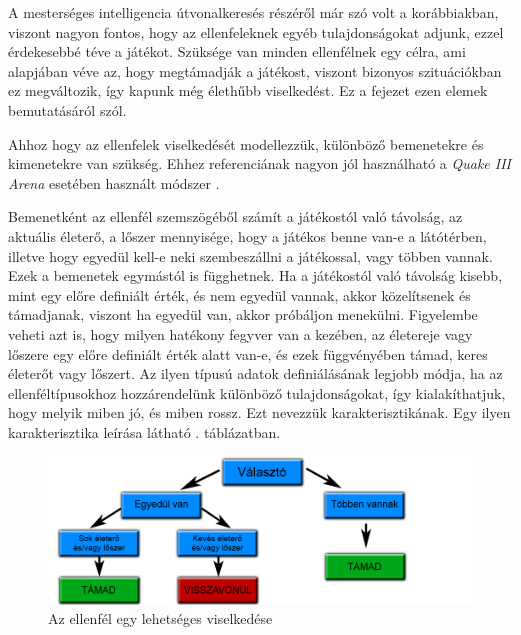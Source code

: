 \label{Chap:viselkedes}

A mesterséges intelligencia útvonalkeresés részéről már szó volt a korábbiakban, viszont nagyon fontos, hogy az ellenfeleknek egyéb tulajdonságokat adjunk, ezzel érdekesebbé téve a játékot. Szüksége van minden ellenfélnek egy célra, ami alapjában véve az, hogy megtámadják a játékost, viszont bizonyos szituációkban ez megváltozik, így kapunk még élethűbb viselkedést. Ez a fejezet ezen elemek bemutatásáról szól.


Ahhoz hogy az ellenfelek viselkedését modellezzük, különböző bemenetekre és kimenetekre van szükség. Ehhez referenciának nagyon jól használható a \textit{Quake III Arena} esetében használt módszer \cite{quakebot}.

Bemenetként az ellenfél szemszögéből számít a játékostól való távolság, az aktuális életerő, a lőszer mennyisége, hogy a játékos benne van-e a látótérben, illetve hogy egyedül kell-e neki szembeszállni a játékossal, vagy többen vannak. Ezek a bemenetek egymástól is függhetnek. Ha a játékostól való távolság kisebb, mint egy előre definiált érték, és nem egyedül vannak, akkor közelítsenek és támadjanak, viszont ha egyedül van, akkor próbáljon menekülni. Figyelembe veheti azt is, hogy milyen hatékony fegyver van a kezében, az életereje vagy lőszere egy előre definiált érték alatt van-e, és ezek függvényében támad, keres életerőt vagy lőszert. Az ilyen típusú adatok definiálásának legjobb módja, ha az ellenféltípusokhoz hozzárendelünk különböző tulajdonságokat, így kialakíthatjuk, hogy melyik miben jó, és miben rossz. Ezt nevezzük karakterisztikának. Egy ilyen karakterisztika leírása látható . táblázatban.

\begin{figure}[h]
\centering
\includegraphics[scale=0.38]{kepek/viselkedes.png}
\caption{Az ellenfél egy lehetséges viselkedése}
\label{fig:behavior}
\end{figure}

